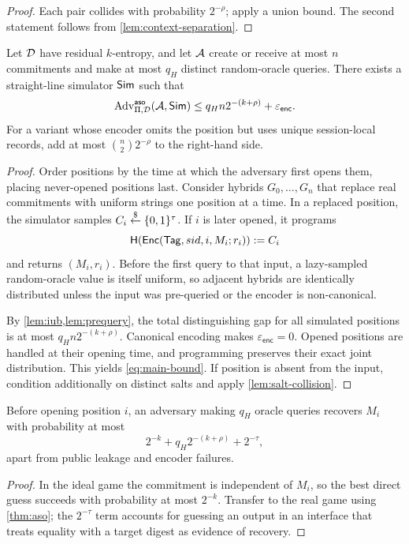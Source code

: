 \begin{proof}
Each pair collides with probability $2^{-\rho}$; apply a union bound.  The
second statement follows from \cref{lem:context-separation}.
\end{proof}

\begin{theorem}
\label{thm:aso}
Let $\mathcal{D}$ have residual $k$-entropy, and let $\mathcal{A}$ create or receive at most
$n$ commitments and make at most $q_H$ distinct random-oracle queries.  There
exists a straight-line simulator
$\mathsf{Sim}$ such that
\begin{equation}
 \operatorname{Adv}^{\mathsf{aso}}_{\Pi,\mathcal{D}}(\mathcal{A},\mathsf{Sim})
 \leq q_Hn2^{-(k+\rho)}+\varepsilon_{\mathsf{enc}}.
 \label{eq:main-bound}
\end{equation}
For a variant whose encoder omits the position but uses unique session-local
records, add at most $\binom n2 2^{-\rho}$ to the right-hand side.
\end{theorem}

\begin{proof}
Order positions by the time at which the adversary first opens them, placing
never-opened positions last.  Consider hybrids $G_0,\ldots,G_n$ that replace
real commitments with uniform strings one position at a time.  In a replaced
position, the simulator samples $C_i\mathrel{\mathop{\leftarrow}\limits^{\$}}\{0,1\}^\tau$.  If $i$ is later
opened, it programs
\[
  \mathsf{H}(\mathsf{Enc}(\mathsf{Tag},sid,i,M_i;r_i)):=C_i
\]
and returns $(M_i,r_i)$.  Before the first query to that input, a lazy-sampled
random-oracle value is itself uniform, so adjacent hybrids are identically
distributed unless the input was pre-queried or the encoder is non-canonical.

By \cref{lem:iub,lem:prequery}, the total distinguishing gap for all simulated
positions is at most $q_Hn2^{-(k+\rho)}$.  Canonical
encoding makes $\varepsilon_{\mathsf{enc}}=0$.  Opened positions are handled
at their opening time, and programming preserves their exact joint
distribution.  This yields \cref{eq:main-bound}.  If position is absent from
the input, condition additionally on distinct salts and apply
\cref{lem:salt-collision}.
\end{proof}

\begin{corollary}
\label{cor:recovery}
Before opening position $i$, an adversary making $q_H$ oracle queries recovers
$M_i$ with probability at most
\[
  2^{-k}+q_H2^{-(k+\rho)}+2^{-\tau},
\]
apart from public leakage and encoder failures.
\end{corollary}

\begin{proof}
In the ideal game the commitment is independent of $M_i$, so the best direct
guess succeeds with probability at most $2^{-k}$.  Transfer to the real game
using \cref{thm:aso}; the $2^{-\tau}$ term accounts for guessing an output in
an interface that treats equality with a target digest as evidence of
recovery.
\end{proof}
